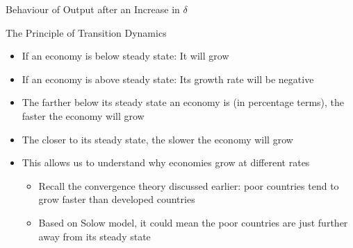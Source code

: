 \documentclass[aspectratio=1610]{beamer}
\begin{document}
\begin{frame}[wide]{Behaviour of Output after an Increase in $\delta$}
	\begin{figure}
		\centering
	\end{figure}
	
\end{frame}

\begin{frame}[wide]{The Principle of Transition Dynamics }
	\begin{itemize}
		\item If an economy is below steady state: 	It will grow
		\item If an economy is above steady state:	Its growth rate will be negative
		\item The farther below its steady state an economy is (in percentage terms), the faster the economy will grow
		\item The closer to its steady state, the slower the economy will grow
		\item This allows us to understand why economies grow at different rates
		\begin{itemize}
			\item Recall the convergence theory discussed earlier: poor countries tend to grow faster than developed countries
			\item Based on Solow model, it could mean the poor countries are just further away from its steady state
		\end{itemize}
		
	\end{itemize}
\end{frame}
\end{document}
